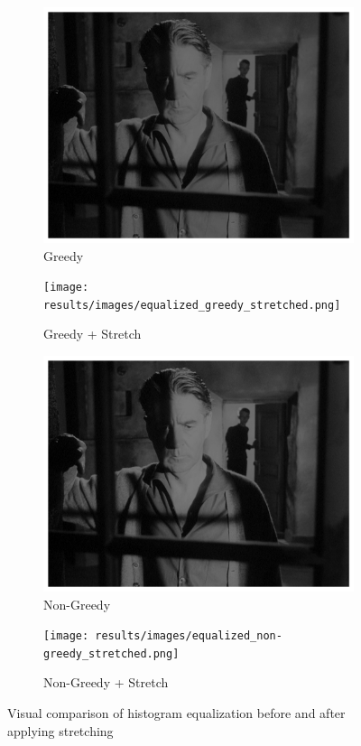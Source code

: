 \documentclass[12pt,a4paper]{article}
\begin{document}
\begin{figure}[H]
    \centering
    \begin{subfigure}{0.48\textwidth}
        \includegraphics[width=\textwidth]{results/images/equalized_greedy.png}
        \caption{Greedy}
    \end{subfigure}
    \hfill
    \begin{subfigure}{0.48\textwidth}
        \texttt{[image: results/images/equalized\_greedy\_stretched.png]}
        \caption{Greedy + Stretch}
    \end{subfigure}
    
    \vspace{0.5cm}
    
    \begin{subfigure}{0.48\textwidth}
        \includegraphics[width=\textwidth]{results/images/equalized_non-greedy.png}
        \caption{Non-Greedy}
    \end{subfigure}
    \hfill
    \begin{subfigure}{0.48\textwidth}
        \texttt{[image: results/images/equalized\_non-greedy\_stretched.png]}
        \caption{Non-Greedy + Stretch}
    \end{subfigure}
    \caption{Visual comparison of histogram equalization before and after applying stretching}
    \label{fig:stretch_comparison}
\end{figure}
\end{document}
